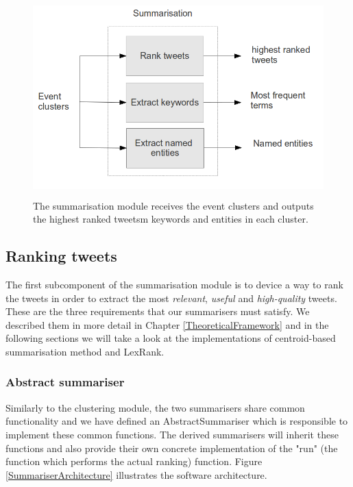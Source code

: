 \begin{figure}[!htbp]
  \begin{center}
    \includegraphics[height=3.0in, width=6in]{summarisation-overview}
    \caption{The summarisation module receives the event clusters and outputs the highest ranked tweetsm keywords and entities in each cluster.}
    \label{SummarisationOverview}
  \end{center}
\end{figure} 

\subsection{Ranking tweets}
The first subcomponent of the summarisation module is to device a way to rank the tweets in order to extract the most \emph{relevant}, \emph{useful} and \emph{high-quality} tweets. These are the three requirements that our summarisers must satisfy. We described them in more detail in Chapter \ref{TheoreticalFramework} and in the following sections we will take a look at the implementations of centroid-based summarisation method and LexRank.

\subsubsection{Abstract summariser}
Similarly to the clustering module, the two summarisers share common functionality and we have defined an AbstractSummariser which is responsible to implement these common functions. The derived summarisers will inherit these functions and also provide their own concrete implementation of the "run" (the function which performs the actual ranking) function. Figure \ref{SummariserArchitecture} illustrates the software architecture. 

